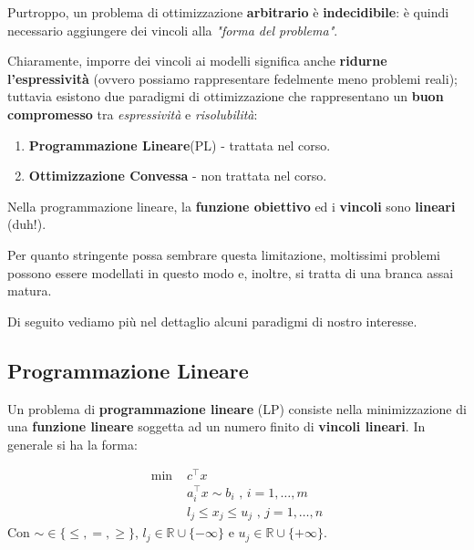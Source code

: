 Purtroppo, un problema di ottimizzazione \textbf{arbitrario} è \textbf{indecidibile}: è
quindi necessario aggiungere dei vincoli alla \textit{"forma del problema"}.

Chiaramente, imporre dei vincoli ai modelli significa anche \textbf{ridurne l'espressività}
(ovvero possiamo rappresentare fedelmente meno problemi reali); tuttavia esistono due
paradigmi di ottimizzazione che rappresentano un \textbf{buon compromesso} tra \textit{espressività}
e \textit{risolubilità}:
\begin{enumerate}
    \item \textbf{Programmazione Lineare}(PL) - trattata nel corso.
    \item \textbf{Ottimizzazione Convessa} - non trattata nel corso.
\end{enumerate}

\begin{remark}
    Nella programmazione lineare, la \textbf{funzione obiettivo} ed i \textbf{vincoli}
    sono \textbf{lineari} (duh!). 

    Per quanto stringente possa sembrare questa limitazione,
    moltissimi problemi possono essere modellati in questo modo e, inoltre, si
    tratta di una branca assai matura.
\end{remark}

Di seguito vediamo più nel dettaglio alcuni paradigmi di nostro interesse.

\subsection{Programmazione Lineare}

Un problema di \textbf{programmazione lineare} (LP) consiste nella minimizzazione di 
una \textbf{funzione lineare} soggetta ad un numero finito di \textbf{vincoli lineari}. 
In generale si ha la forma:

\begin{definition}
    \[
        \begin{aligned}
            \text{min } &c^\top x \\ 
                        &a_i^\top x \sim b_i \text{ , }i=1,\ldots,m \\ 
                        &l_j \le x_j \le u_j \text{ , }j=1,\ldots ,n
        \end{aligned}
    \] 
    Con $\sim \in \{\le , =, \ge \}  $, $l_j\in \mathbb{R} \cup \{-\infty\}  $ 
    e $u_j\in \mathbb{R}\cup \{+\infty\}$.
\end{definition}

